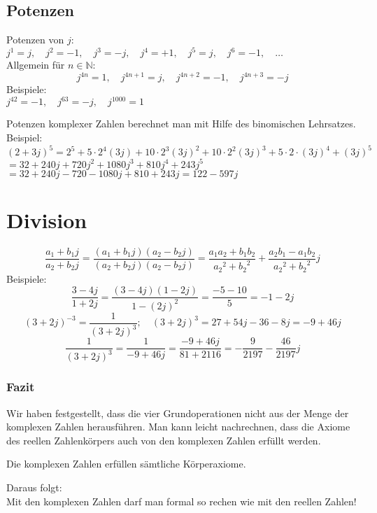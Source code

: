 \subsection{Potenzen}
Potenzen von $j$: \\
$j^1 = j, \quad j^2 = -1, \quad j^3 = -j, \quad j^4 = +1, \quad j^5 = j, \quad j^6 = -1, \quad \dots$\\
Allgemein für $n \in \mathbb{N}$: 
\[ \boxed{j^{4n} = 1, \quad j^{4n+1} = j, \quad j^{4n+2} = -1, \quad j^{4n+3} = -j} \]
Beispiele: \\
$j^{42} = -1, \quad j^{63} = -j, \quad j^{1000} = 1$

Potenzen komplexer Zahlen berechnet man mit Hilfe des binomischen Lehrsatzes. \\
Beispiel: \\
$(2 + 3 j)^5 = 2^5 + 5 \cdot 2^4 (3 j) + 10 \cdot 2^3 (3 j)^2 + 10 \cdot 2^2 (3 j)^3 + 5 \cdot 2 \cdot (3 j)^4 + (3 j)^5$\\
$ = 32 + 240 j + 720 j^2 + 1080 j^3 + 810 j^4 + 243 j^5$\\
$= 32 + 240 j - 720 - 1080 j + 810 + 243 j = 122 - 597 j$

\section{Division}
\[ \boxed{\frac{a_1 + b_1 j}{a_2 + b_2 j} = \frac{(a_1 + b_1 j)(a_2 - b_2 j)}{(a_2 + b_2 j)(a_2 - b_2 j)} = \frac{a_1 a_2 + b_1 b_2}{{a_2}^2 + {b_2}^2} + \frac{a_2 b_1 - a_1 b_2}{{a_2}^2 + {b_2}^2} j} \]
Beispiele: \\
\[ \frac{3 - 4 j}{1 + 2 j} = \frac{(3 - 4 j)(1 - 2 j)}{1 - (2 j)^2} = \frac{-5 -10}{5} = -1 -2 j \]
\[ (3 + 2 j)^{-3} = \frac{1}{(3 + 2 j)^3}; \quad (3 + 2 j)^3 = 27 + 54 j - 36 - 8 j = -9 + 46 j \]
\[ \frac{1}{(3 + 2 j)^3} = \frac{1}{-9 + 46 j} = \frac{-9 + 46 j}{81 + 2116} = -\frac{9}{2197} - \frac{46}{2197} j \]

\subsubsection{Fazit}
Wir haben festgestellt, dass die vier Grundoperationen nicht aus der Menge der komplexen Zahlen herausführen. Man kann leicht nachrechnen, dass die Axiome des reellen Zahlenkörpers auch von den komplexen Zahlen erfüllt werden. 
\begin{framed}\noindent
  Die komplexen Zahlen erfüllen sämtliche Körperaxiome. 
\end{framed}\noindent
Daraus folgt: \\
Mit den komplexen Zahlen darf man formal so rechen wie mit den reellen Zahlen! 

